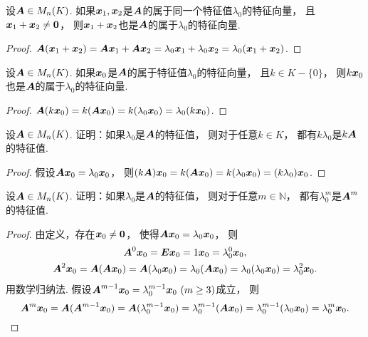\begin{proposition}\label{theorem:矩阵的特征值与特征向量.特征子空间1}
设\(\boldsymbol{A} \in M_n(K)\).
如果\(\boldsymbol{x}_1,\boldsymbol{x}_2\)是\(\boldsymbol{A}\)的属于同一个特征值\(\lambda_0\)的特征向量，
且\(\boldsymbol{x}_1 + \boldsymbol{x}_2 \neq \boldsymbol0\)，
则\(\boldsymbol{x}_1 + \boldsymbol{x}_2\)也是\(\boldsymbol{A}\)的属于\(\lambda_0\)的特征向量.
\begin{proof}
\(\boldsymbol{A} (\boldsymbol{x}_1 + \boldsymbol{x}_2)
= \boldsymbol{A} \boldsymbol{x}_1 + \boldsymbol{A} \boldsymbol{x}_2
= \lambda_0 \boldsymbol{x}_1 + \lambda_0 \boldsymbol{x}_2
= \lambda_0 (\boldsymbol{x}_1 + \boldsymbol{x}_2)\).
\end{proof}
\end{proposition}
\begin{proposition}\label{theorem:矩阵的特征值与特征向量.特征子空间2}
设\(\boldsymbol{A} \in M_n(K)\).
如果\(\boldsymbol{x}_0\)是\(\boldsymbol{A}\)的属于特征值\(\lambda_0\)的特征向量，
且\(k \in K-\{0\}\)，
则\(k \boldsymbol{x}_0\)也是\(\boldsymbol{A}\)的属于\(\lambda_0\)的特征向量.
\begin{proof}
\(\boldsymbol{A} (k \boldsymbol{x}_0)
= k (\boldsymbol{A} \boldsymbol{x}_0)
= k (\lambda_0 \boldsymbol{x}_0)
= \lambda_0 (k \boldsymbol{x}_0)\).
\end{proof}
\end{proposition}
\begin{example}\label{example:矩阵的特征值与特征向量.矩阵的多项式的特征值1}
设\(\boldsymbol{A} \in M_n(K)\).
证明：如果\(\lambda_0\)是\(\boldsymbol{A}\)的特征值，
则对于任意\(k \in K\)，
都有\(k\lambda_0\)是\(k\boldsymbol{A}\)的特征值.
\begin{proof}
假设\(\boldsymbol{A} \boldsymbol{x}_0 = \lambda_0 \boldsymbol{x}_0\)，
则\((k\boldsymbol{A}) \boldsymbol{x}_0
= k(\boldsymbol{A} \boldsymbol{x}_0)
= k(\lambda_0 \boldsymbol{x}_0)
= (k\lambda_0) \boldsymbol{x}_0\).
\end{proof}
\end{example}
\begin{example}\label{example:矩阵的特征值与特征向量.矩阵的多项式的特征值2}
设\(\boldsymbol{A} \in M_n(K)\).
证明：如果\(\lambda_0\)是\(\boldsymbol{A}\)的特征值，
则对于任意\(m\in\mathbb{N}\)，
都有\(\lambda_0^m\)是\(\boldsymbol{A}^m\)的特征值.
\begin{proof}
由定义，存在\(\boldsymbol{x}_0\neq\boldsymbol0\)，
使得\(\boldsymbol{A}\boldsymbol{x}_0 = \lambda_0\boldsymbol{x}_0\)，
则\begin{gather*}
	\boldsymbol{A}^0 \boldsymbol{x}_0
	= \boldsymbol{E} \boldsymbol{x}_0
	= 1 \boldsymbol{x}_0
	= \lambda_0^0 \boldsymbol{x}_0, \\
	\boldsymbol{A}^2\boldsymbol{x}_0 = \boldsymbol{A}(\boldsymbol{A}\boldsymbol{x}_0)
	= \boldsymbol{A}(\lambda_0\boldsymbol{x}_0)
	= \lambda_0(\boldsymbol{A}\boldsymbol{x}_0)
	= \lambda_0(\lambda_0\boldsymbol{x}_0)
	= \lambda_0^2\boldsymbol{x}_0.
\end{gather*}
用数学归纳法.
假设\(\vb{A}^{m-1}\vb{x}_0 = \lambda_0^{m-1}\vb{x}_0\ (m\geq3)\)成立，
则\begin{equation*}
	\boldsymbol{A}^m\boldsymbol{x}_0 = \boldsymbol{A}(\boldsymbol{A}^{m-1}\boldsymbol{x}_0)
	= \boldsymbol{A}(\lambda_0^{m-1}\boldsymbol{x}_0)
	= \lambda_0^{m-1}(\boldsymbol{A}\boldsymbol{x}_0)
	= \lambda_0^{m-1}(\lambda_0\boldsymbol{x}_0)
	= \lambda_0^m\boldsymbol{x}_0.
	\qedhere
\end{equation*}
\end{proof}
\end{example}
